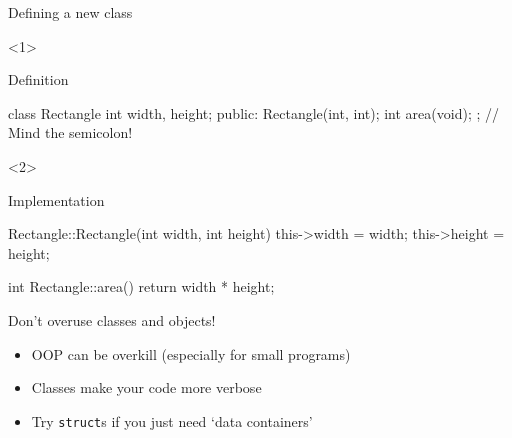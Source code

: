 \begin{frame}[fragile]{Defining a new class}
    \begin{onlyenv}<1>
        \begin{block}{Definition}
            \begin{cpp}
                class Rectangle {
                    int width, height;
                    public:
                        Rectangle(int, int);
                        int area(void);
                }; // Mind the semicolon!
            \end{cpp}
        \end{block}
    \end{onlyenv}
    \begin{onlyenv}<2>
        \begin{block}{Implementation}
            \begin{cpp}
                Rectangle::Rectangle(int width, int height)
                {
                    this->width = width;
                    this->height = height;
                }

                int Rectangle::area()
                {
                    return width * height;
                }
            \end{cpp}
        \end{block}
    \end{onlyenv}
\end{frame}

\begin{frame}[fragile]{Don't overuse classes and objects!}
    \begin{itemize}
        \item OOP can be overkill (especially for small programs)
        \item Classes make your code more verbose
        \item Try \texttt{struct}s if you just need `data containers'
    \end{itemize}
\end{frame}



